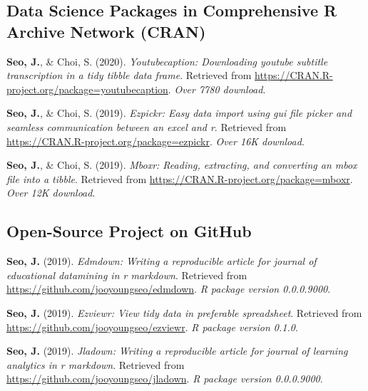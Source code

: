 \documentclass[11pt, a4paper]{awesome-cv}
\begin{document}
\hypertarget{data-science-packages-in-comprehensive-r-archive-network-cran}{%
\subsection{Data Science Packages in Comprehensive R Archive Network
(CRAN)}\label{data-science-packages-in-comprehensive-r-archive-network-cran}}

\hypertarget{refs_R_packages}{}
\leavevmode\hypertarget{ref-R-youtubecaption}{}%
\textbf{Seo, J.}, \& Choi, S. (2020). \emph{Youtubecaption: Downloading
youtube subtitle transcription in a tidy tibble data frame}. Retrieved
from \url{https://CRAN.R-project.org/package=youtubecaption}. \emph{Over
7780 download}.

\leavevmode\hypertarget{ref-R-ezpickr}{}%
\textbf{Seo, J.}, \& Choi, S. (2019). \emph{Ezpickr: Easy data import
using gui file picker and seamless communication between an excel and
r}. Retrieved from \url{https://CRAN.R-project.org/package=ezpickr}.
\emph{Over 16K download}.

\leavevmode\hypertarget{ref-R-mboxr}{}%
\textbf{Seo, J.}, \& Choi, S. (2019). \emph{Mboxr: Reading, extracting,
and converting an mbox file into a tibble}. Retrieved from
\url{https://CRAN.R-project.org/package=mboxr}. \emph{Over 12K
download}.

\hypertarget{open-source-project-on-github}{%
\subsection{Open-Source Project on
GitHub}\label{open-source-project-on-github}}

\hypertarget{refs_github_projects}{}
\leavevmode\hypertarget{ref-R-edmdown}{}%
\textbf{Seo, J.} (2019). \emph{Edmdown: Writing a reproducible article
for journal of educational datamining in r markdown}. Retrieved from
\url{https://github.com/jooyoungseo/edmdown}. \emph{R package version
0.0.0.9000}.

\leavevmode\hypertarget{ref-R-ezviewr}{}%
\textbf{Seo, J.} (2019). \emph{Ezviewr: View tidy data in preferable
spreadsheet}. Retrieved from
\url{https://github.com/jooyoungseo/ezviewr}. \emph{R package version
0.1.0}.

\leavevmode\hypertarget{ref-R-jladown}{}%
\textbf{Seo, J.} (2019). \emph{Jladown: Writing a reproducible article
for journal of learning analytics in r markdown}. Retrieved from
\url{https://github.com/jooyoungseo/jladown}. \emph{R package version
0.0.0.9000}.
\end{document}
